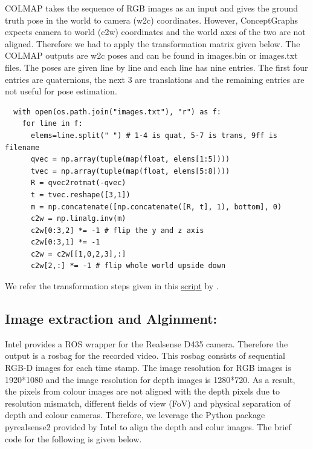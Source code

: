 COLMAP takes the sequence of RGB images as an input and gives the ground truth pose in the world to camera (w2c) coordinates. However, ConceptGraphs expects camera to world (c2w)
coordinates and the world axes of the two are not aligned. Therefore we had to apply the transformation matrix given below. The COLMAP outputs are w2c poses and can be found 
in images.bin or images.txt files. The poses are given line by line and each line has nine entries. The first four entries are quaternions, the next 3 are translations and the remaining entries are
not useful for pose estimation.

\begin{lstlisting}
  with open(os.path.join("images.txt"), "r") as f:
    for line in f:
      elems=line.split(" ") # 1-4 is quat, 5-7 is trans, 9ff is filename 
      qvec = np.array(tuple(map(float, elems[1:5])))
      tvec = np.array(tuple(map(float, elems[5:8])))
      R = qvec2rotmat(-qvec)
      t = tvec.reshape([3,1])
      m = np.concatenate([np.concatenate([R, t], 1), bottom], 0)
      c2w = np.linalg.inv(m)
      c2w[0:3,2] *= -1 # flip the y and z axis
      c2w[0:3,1] *= -1
      c2w = c2w[[1,0,2,3],:]
      c2w[2,:] *= -1 # flip whole world upside down
\end{lstlisting}
We refer the transformation steps given in this \href{https://github.com/NVlabs/instant-ngp/blob/master/scripts/colmap2nerf.py}{script} by \citet{mueller2022instant}. 

\subsection{Image extraction and Alginment:}
Intel provides a ROS wrapper for the Realsense D435  camera. Therefore the output is a rosbag for the recorded video. This rosbag consists of sequential RGB-D images for each time
stamp. The image resolution for RGB images is 1920*1080 and the image resolution for depth images is 1280*720. As a result, the pixels from colour images are not aligned with the depth pixels due to 
resolution mismatch, different fields of view (FoV) and physical separation of depth and colour cameras. Therefore, we leverage the Python package pyrealsense2 provided by Intel to align the depth and colur images. 
The brief code for the following is given below. 

